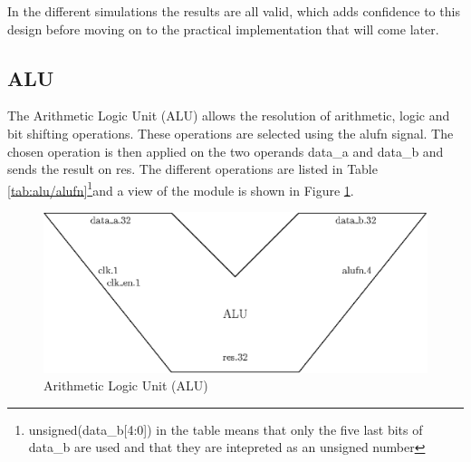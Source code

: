 In the different simulations the results are all valid, which adds confidence to this design before 
moving on to the practical implementation that will come later.

\subsection{ALU}

The Arithmetic Logic Unit (ALU) allows the resolution of arithmetic, logic and bit shifting 
operations. These operations are selected using the alufn signal. The chosen operation is then 
applied on the two operands data\_a and data\_b and sends the result on res. The different 
operations are listed in Table \ref{tab:alu/alufn}\footnote{unsigned(data\_b[4:0]) in the table means 
that only the five last bits of data\_b are used and that they are intepreted as an unsigned number
}and a view of the module is shown in Figure \ref{fig:components/alu}. 

\begin{figure}[ht]
    \centering
    \includegraphics[scale=0.8]{Chapter3-CPU/res/alu}
    \caption{Arithmetic Logic Unit (ALU)}
    \label{fig:components/alu}
\end{figure}

